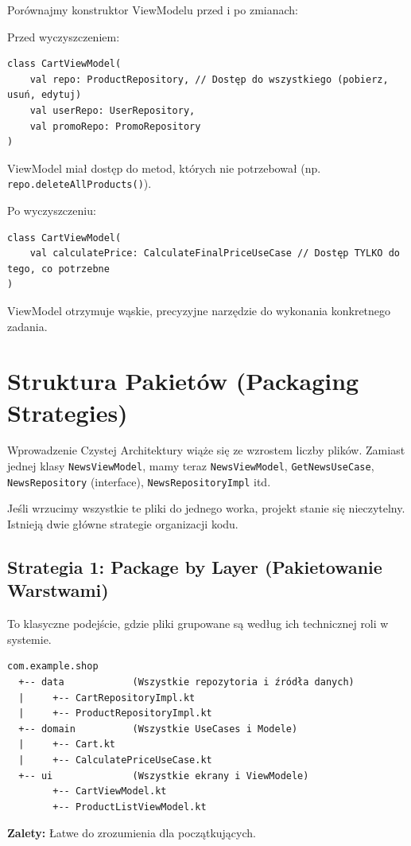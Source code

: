 Porównajmy konstruktor ViewModelu przed i po zmianach:

Przed wyczyszczeniem:
\begin{verbatim}
class CartViewModel(
    val repo: ProductRepository, // Dostęp do wszystkiego (pobierz, usuń, edytuj)
    val userRepo: UserRepository,
    val promoRepo: PromoRepository
)
\end{verbatim}
ViewModel miał dostęp do metod, których nie potrzebował (np. \texttt{repo.deleteAllProducts()}).

Po wyczyszczeniu:
\begin{verbatim}
class CartViewModel(
    val calculatePrice: CalculateFinalPriceUseCase // Dostęp TYLKO do tego, co potrzebne
)
\end{verbatim}
ViewModel otrzymuje wąskie, precyzyjne narzędzie do wykonania konkretnego zadania.

\section{Struktura Pakietów (Packaging Strategies)}

Wprowadzenie Czystej Architektury wiąże się ze wzrostem liczby plików. Zamiast jednej klasy \texttt{NewsViewModel}, mamy teraz \texttt{NewsViewModel}, \texttt{GetNewsUseCase}, \texttt{NewsRepository} (interface), \texttt{NewsRepositoryImpl} itd.

Jeśli wrzucimy wszystkie te pliki do jednego worka, projekt stanie się nieczytelny. Istnieją dwie główne strategie organizacji kodu.

\subsection{Strategia 1: Package by Layer (Pakietowanie Warstwami)}

To klasyczne podejście, gdzie pliki grupowane są według ich technicznej roli w systemie.

\begin{verbatim}
com.example.shop
  +-- data            (Wszystkie repozytoria i źródła danych)
  |     +-- CartRepositoryImpl.kt
  |     +-- ProductRepositoryImpl.kt
  +-- domain          (Wszystkie UseCases i Modele)
  |     +-- Cart.kt
  |     +-- CalculatePriceUseCase.kt
  +-- ui              (Wszystkie ekrany i ViewModele)
        +-- CartViewModel.kt
        +-- ProductListViewModel.kt
\end{verbatim}

\textbf{Zalety:} Łatwe do zrozumienia dla początkujących.

